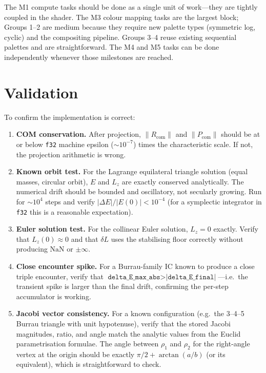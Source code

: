 \documentclass[11pt]{article}
\newcommand{\field}[1]{\texttt{#1}}
\begin{document}
The M1 compute tasks should be done as a single unit of work---they are tightly
coupled in the shader. The M3 colour mapping tasks are the largest block; Groups
1--2 are medium because they require new palette types (symmetric log, cyclic)
and the compositing pipeline. Groups 3--4 reuse existing sequential palettes
and are straightforward. The M4 and M5 tasks can be done independently whenever
those milestones are reached.

\section{Validation}
\label{sec:validation}

To confirm the implementation is correct:

\begin{enumerate}[nosep]
    \item \textbf{COM conservation.} After projection, $\|R_{\text{com}}\|$ and
    $\|P_{\text{com}}\|$ should be at or below \texttt{f32} machine epsilon
    ($\sim 10^{-7}$) times the characteristic scale. If not, the projection
    arithmetic is wrong.

    \item \textbf{Known orbit test.} For the Lagrange equilateral triangle
    solution (equal masses, circular orbit), $E$ and $L_z$ are exactly conserved
    analytically. The numerical drift should be bounded and oscillatory, not
    secularly growing. Run for $\sim 10^4$ steps and verify
    $|\Delta E| / |E(0)| < 10^{-4}$ (for a symplectic integrator in \texttt{f32}
    this is a reasonable expectation).

    \item \textbf{Euler solution test.} For the collinear Euler solution,
    $L_z = 0$ exactly. Verify that $L_z(0) \approx 0$ and that $\delta L$
    uses the stabilising floor correctly without producing $\text{NaN}$ or
    $\pm\infty$.

    \item \textbf{Close encounter spike.} For a Burrau-family IC known to
    produce a close triple encounter, verify that
    $\field{delta\_E\_max\_abs} > \field{|delta\_E\_final|}$---i.e.\ the
    transient spike is larger than the final drift, confirming the per-step
    accumulator is working.

    \item \textbf{Jacobi vector consistency.} For a known configuration (e.g.\
    the 3--4--5 Burrau triangle with unit hypotenuse), verify that the stored
    Jacobi magnitudes, ratio, and angle match the analytic values from the
    Euclid parametrisation formulae. The angle between $\rho_1$ and $\rho_2$
    for the right-angle vertex at the origin should be exactly
    $\pi/2 + \arctan(a/b)$ (or its equivalent), which is straightforward to
    check.


\end{enumerate}
\end{document}
